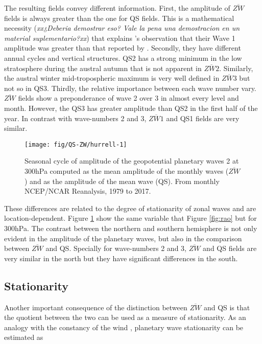 \documentclass[draft,linenumbers]{agujournal2018}
\begin{document}
The resulting fields convey different information. First, the amplitude
of \(\overline{ZW}\) fields is always greater than the one for QS
fields. This is a mathematical necessity (\emph{xx¿Deberia demostrar
eso? Vale la pena una demostracion en un material suplementario?xx})
that explains \citet{Rao2004}'s observation that their Wave 1 amplitude
was greater than that reported by \citet{Hurrell1998}. Secondly, they
have different annual cycles and vertical structures. QS2 has a strong
minimum in the low stratosphere during the austral autumn that is not
apparent in \(\overline{ZW2}\). Similarly, the austral winter
mid-tropospheric maximum is very well defined in \(\overline{ZW3}\) but
not so in QS3. Thirdly, the relative importance between each wave number
vary. \(\overline{ZW}\) fields show a preponderance of wave 2 over 3 in
almost every level and month. However, the QS3 has greater amplitude
than QS2 in the first half of the year. In contrast with wave-numbers 2
and 3, \(\overline{ZW1}\) and QS1 fields are very similar.

\begin{figure}[h]

{\centering \texttt{[image: fig/QS-ZW/hurrell-1]} 

}

\caption{Seasonal cycle of amplitude of the geopotential planetary waves 2 at 300hPa computed as the mean amplitude of the monthly waves ($\overline{ZW}$) and as the amplitude of the mean wave (QS). From monthly NCEP/NCAR Reanalysis, 1979 to 2017.}\label{fig:hurrell}
\end{figure}

These differences are related to the degree of stationarity of zonal
waves and are location-dependent. Figure \ref{fig:hurrell} show the same
variable that Figure \ref{fig:rao} but for 300hPa. The contrast between
the northern and southern hemisphere is not only evident in the
amplitude of the planetary waves, but also in the comparison between
\(\overline{ZW}\) and QS. Specially for wave-numbers 2 and 3,
\(\overline{ZW}\) and QS fields are very similar in the north but they
have significant differences in the south.

\subsection{Stationarity}

Another important consequence of the distinction between
\(\overline{ZW}\) and QS is that the quotient between the two can be
used as a measure of stationarity. As an analogy with the constancy of
the wind \citep{Singer1967}, planetary wave stationarity can be
estimated as
\end{document}

